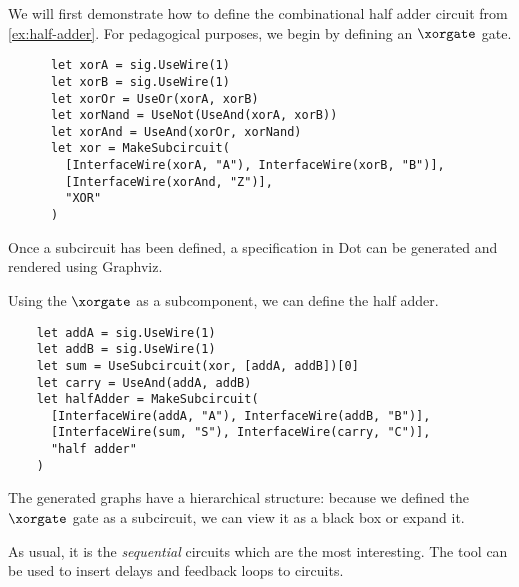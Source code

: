 \begin{example}
    We will first demonstrate how to define the combinational half adder circuit
    from \cref{ex:half-adder}.
    For pedagogical purposes, we begin by defining an \(\xorgate\) gate.
    \begin{lstlisting}
      let xorA = sig.UseWire(1)
      let xorB = sig.UseWire(1)
      let xorOr = UseOr(xorA, xorB)
      let xorNand = UseNot(UseAnd(xorA, xorB))
      let xorAnd = UseAnd(xorOr, xorNand)
      let xor = MakeSubcircuit(
        [InterfaceWire(xorA, "A"), InterfaceWire(xorB, "B")],
        [InterfaceWire(xorAnd, "Z")],
        "XOR"
      )
    \end{lstlisting}

    Once a subcircuit has been defined, a specification in Dot can be generated
    and rendered using Graphviz.

    \begin{center}
        
    \end{center}

    Using the \(\xorgate\) as a subcomponent, we can define the half adder.

    \begin{lstlisting}
    let addA = sig.UseWire(1)
    let addB = sig.UseWire(1)
    let sum = UseSubcircuit(xor, [addA, addB])[0]
    let carry = UseAnd(addA, addB)
    let halfAdder = MakeSubcircuit(
      [InterfaceWire(addA, "A"), InterfaceWire(addB, "B")],
      [InterfaceWire(sum, "S"), InterfaceWire(carry, "C")],
      "half adder"
    )
    \end{lstlisting}

    The generated graphs have a hierarchical structure: because we defined the
    \(\xorgate\) gate as a subcircuit, we can view it as a black box or
    expand it.

    \begin{center}
        

        \vspace{1em}

        
    \end{center}
\end{example}

As usual, it is the \emph{sequential} circuits which are the most interesting.
The tool can be used to insert delays and feedback loops to circuits.

